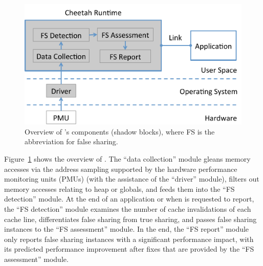 \begin{figure}[htbp]
\centering
\includegraphics[width=1\columnwidth]{figure/cheetahcomponents}
\caption{Overview of \cheetah{}'s components (shadow blocks), where FS is the abbreviation for false sharing.}
\label{fig:components}
\end{figure}



%
Figure~\ref{fig:components} shows the overview of \Cheetah{}. 
The ``data collection'' module gleans memory accesses via the address sampling supported by the hardware performance monitoring units (PMUs) (with the assistance of the ``driver'' module), filters out memory accesses relating to heap or globals, and feeds them into the ``FS detection'' module. At the end of an application or when \cheetah{} is requested to report, the ``FS detection'' module examines the number of cache invalidations of each cache line, differentiates false sharing from true sharing, and passes false sharing instances to the ``FS assessment'' module. In the end, the ``FS report'' module only reports false sharing instances with a significant performance impact, with its predicted performance improvement after fixes that are provided by the ``FS assessment'' module. 

